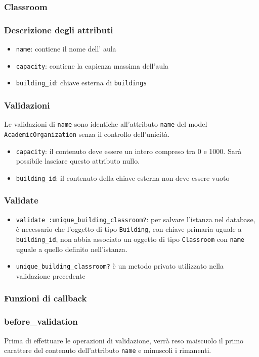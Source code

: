 \documentclass[11pt,a4paper]{article}
\begin{document}
\subsubsection{Classroom}
\subsubsection*{Descrizione degli attributi}
\begin{itemize}
 \item \verb|name|: contiene il nome dell' aula
 \item \verb|capacity|: contiene la capienza massima dell'aula
 \item \verb|building_id|: chiave esterna di \verb|buildings|	
\end{itemize}
\subsubsection*{Validazioni}
Le validazioni di \verb|name| sono identiche all'attributo \verb|name| del model \\ \verb|AcademicOrganization| senza il controllo dell'unicità.
\begin{itemize}
\item \verb|capacity|: il contenuto deve essere un intero compreso tra 0 e 1000. Sarà possibile lasciare questo attributo nullo.
\item \verb|building_id|: il contenuto della chiave esterna non deve essere vuoto 
\end{itemize}
\subsubsection*{Validate}
\begin{itemize}
 \item \verb|validate :unique_building_classroom?|: per salvare l'istanza nel database, è necessario che l'oggetto di tipo \verb|Building|, con chiave primaria uguale a \verb|building_id|, non abbia associato un oggetto di tipo \verb|Classroom| con \verb|name| uguale a quello definito nell'istanza.
\item \verb|unique_building_classroom?| è un metodo privato utilizzato nella validazione precedente
\end{itemize}
\subsubsection*{Funzioni di callback}
\subsubsection*{before\_validation}
Prima di effettuare le operazioni di validazione, verrà reso maiscuolo il primo carattere del contenuto dell'attributo \verb|name| e minuscoli i rimanenti.
\end{document}
